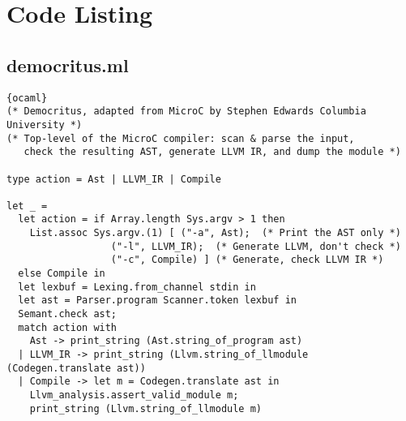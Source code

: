 \chapter{Code Listing}
\section{democritus.ml}
\begin{lstlisting}{ocaml}
(* Democritus, adapted from MicroC by Stephen Edwards Columbia University *)
(* Top-level of the MicroC compiler: scan & parse the input,
   check the resulting AST, generate LLVM IR, and dump the module *)

type action = Ast | LLVM_IR | Compile

let _ =
  let action = if Array.length Sys.argv > 1 then
    List.assoc Sys.argv.(1) [ ("-a", Ast);	(* Print the AST only *)
			      ("-l", LLVM_IR);  (* Generate LLVM, don't check *)
			      ("-c", Compile) ] (* Generate, check LLVM IR *)
  else Compile in
  let lexbuf = Lexing.from_channel stdin in
  let ast = Parser.program Scanner.token lexbuf in
  Semant.check ast;
  match action with
    Ast -> print_string (Ast.string_of_program ast)
  | LLVM_IR -> print_string (Llvm.string_of_llmodule (Codegen.translate ast))
  | Compile -> let m = Codegen.translate ast in
    Llvm_analysis.assert_valid_module m;
    print_string (Llvm.string_of_llmodule m)
\end{lstlisting}
